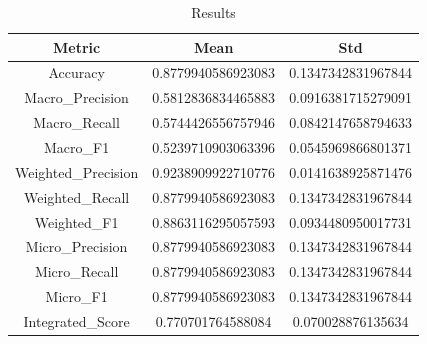 \begin{table}[htbp]
\centering
\caption{Results}
\label{tab:csv}
\small
\setlength{\tabcolsep}{4pt}
\begin{tabular}{|c|c|c|}
\hline
Metric & Mean & Std \\
\hline
Accuracy & 0.8779940586923083 & 0.1347342831967844 \\
Macro_Precision & 0.5812836834465883 & 0.0916381715279091 \\
Macro_Recall & 0.5744426556757946 & 0.0842147658794633 \\
Macro_F1 & 0.5239710903063396 & 0.0545969866801371 \\
Weighted_Precision & 0.9238909922710776 & 0.0141638925871476 \\
Weighted_Recall & 0.8779940586923083 & 0.1347342831967844 \\
Weighted_F1 & 0.8863116295057593 & 0.0934480950017731 \\
Micro_Precision & 0.8779940586923083 & 0.1347342831967844 \\
Micro_Recall & 0.8779940586923083 & 0.1347342831967844 \\
Micro_F1 & 0.8779940586923083 & 0.1347342831967844 \\
Integrated_Score & 0.770701764588084 & 0.070028876135634 \\
\hline
\end{tabular}
\end{table}